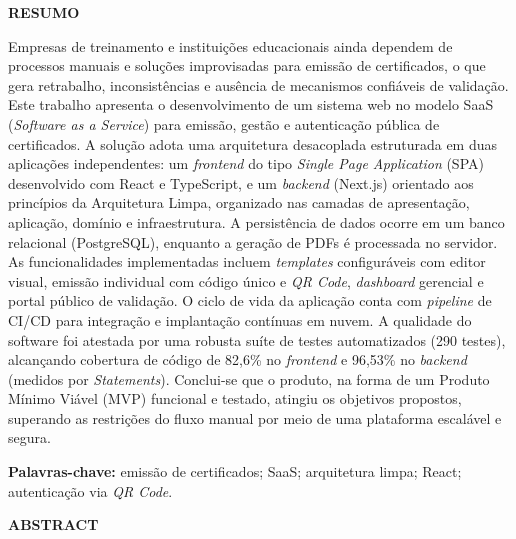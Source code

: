 \documentclass[12pt,openright,oneside,a4paper]{article}
\begin{document}
\vspace{1cm}

\thispagestyle{pretextual}
\begin{center}
\textbf{RESUMO}
\end{center}

Empresas de treinamento e instituições educacionais ainda dependem de processos manuais e soluções improvisadas para emissão de certificados, o que gera retrabalho, inconsistências e ausência de mecanismos confiáveis de validação. Este trabalho apresenta o desenvolvimento de um sistema web no modelo SaaS (\textit{Software as a Service}) para emissão, gestão e autenticação pública de certificados. A solução adota uma arquitetura desacoplada estruturada em duas aplicações independentes: um \textit{frontend} do tipo \textit{Single Page Application} (SPA) desenvolvido com React e TypeScript, e um \textit{backend} (Next.js) orientado aos princípios da Arquitetura Limpa, organizado nas camadas de apresentação, aplicação, domínio e infraestrutura. A persistência de dados ocorre em um banco relacional (PostgreSQL), enquanto a geração de PDFs é processada no servidor. As funcionalidades implementadas incluem \textit{templates} configuráveis com editor visual, emissão individual com código único e \textit{QR Code}, \textit{dashboard} gerencial e portal público de validação. O ciclo de vida da aplicação conta com \textit{pipeline} de CI/CD para integração e implantação contínuas em nuvem. A qualidade do software foi atestada por uma robusta suíte de testes automatizados (290 testes), alcançando cobertura de código de 82,6\% no \textit{frontend} e 96,53\% no \textit{backend} (medidos por \textit{Statements}). Conclui-se que o produto, na forma de um Produto Mínimo Viável (MVP) funcional e testado, atingiu os objetivos propostos, superando as restrições do fluxo manual por meio de uma plataforma escalável e segura.

\noindent\textbf{Palavras-chave:} emissão de certificados; SaaS; arquitetura limpa; React; autenticação via \textit{QR Code}.

\newpage
\begin{center}
\textbf{ABSTRACT}
\end{center}
\end{document}
